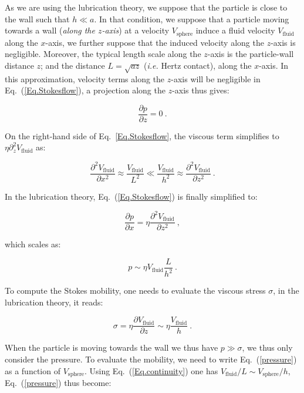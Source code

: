 As we are using the lubrication theory, we suppose that the particle is close to the wall such that $h \ll a$. In that condition, we suppose that a particle moving towards a wall (\textit{along the $z$-axis}) at a velocity $V_\mathrm{sphere}$ induce a fluid velocity $V_\mathrm{fluid}$ along the $x$-axis, we further suppose that the induced velocity along the $z$-axis is negligible. Moreover, the typical length scale along the $z$-axis is the particle-wall distance $z$; and the distance $L=\sqrt{az}$ (\textit{i.e.} Hertz contact), along the $x$-axis. In this approximation, velocity terms along the $z$-axis will be negligible in Eq.~(\ref{Eq.Stokesflow}), a projection along the $z$-axis thus gives:

\begin{equation}
	\frac{\partial p}{\partial z} = 0 ~.
\end{equation}

On the right-hand side of Eq.~\ref{Eq.Stokesflow}, the viscous term simplifies to $\eta \partial_z^2 V_\mathrm{fluid} $ as:

\begin{equation}
	\frac{\partial^2 V_\mathrm{fluid}}{\partial x^2} \approx \frac{V_\mathrm{fluid}}{L^2} \ll \frac{V_\mathrm{fluid}}{h^2} \approx \frac{\partial^2 V_\mathrm{fluid}}{\partial z^2}~.
\end{equation}

In the lubrication theory, Eq.~(\ref{Eq.Stokesflow}) is finally simplified to:

\begin{equation}
	\frac{\partial p}{\partial x} = \eta \frac{\partial ^2 V_\mathrm{fluid}}{\partial z^2}~,
\end{equation}

which scales as:

\begin{equation}
	p \sim \eta V_\mathrm{fluid} \frac{L}{h^2}~.
	\label{pressure}
\end{equation}

To compute the Stokes mobility, one needs to evaluate the viscous stress $\sigma$, in the lubrication theory, it reads:

\begin{equation}
	\sigma = \eta \frac{\partial V_\mathrm{fluid}}{\partial z} \sim \eta \frac{V_\mathrm{fluid}}{h} ~.
\end{equation}

When the particle is moving towards the wall we thus have $p\gg \sigma$, we thus only consider the pressure. To evaluate the mobility, we need to write Eq.~(\ref{pressure}) as a function of $V_\mathrm{sphere}$. Using Eq.~(\ref{Eq.continuity}) one has $V_\mathrm{fluid} / L \sim  V_\mathrm{sphere} / h$, Eq.~(\ref{pressure}) thus become:

